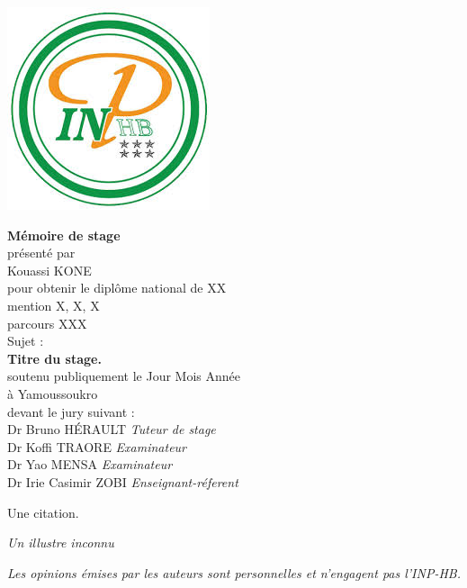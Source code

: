 \includegraphics[width=0.3\columnwidth]{images/INPHB.png}

\begin{center}
  \LARGE{\textbf{Mémoire de stage}} \\
  \vspace*{\fill}
  \large{présenté par} \\
  \large{Kouassi KONE} \\
  \vspace*{\fill}
  \large{pour obtenir le diplôme national de XX} \\
  \large{mention X, X, X} \\
  \small{parcours XXX} \\
  \vspace*{\fill}
  \large{Sujet :} \\
  \Large{\textbf{Titre du stage.}} \\
  \vspace*{\fill}
  \large{soutenu publiquement le Jour Mois Année} \\
  \large{à Yamoussoukro} \\
  \vspace*{\fill}
  \large{devant le jury suivant :} \\
  \vspace*{\fill}
  Dr Bruno HÉRAULT  \emph{Tuteur de stage} \\
  Dr Koffi TRAORE  \emph{Examinateur} \\
  Dr Yao MENSA  \emph{Examinateur} \\
  Dr Irie Casimir ZOBI  \emph{Enseignant-réferent} \\
\end{center}

\newpage
\vspace*{\fill}
\epigraph{Une citation.}{\textit{Un illustre inconnu}}
\vspace*{\fill}
\emph{Les opinions émises par les auteurs sont personnelles et n'engagent pas l'INP-HB.}
\newpage